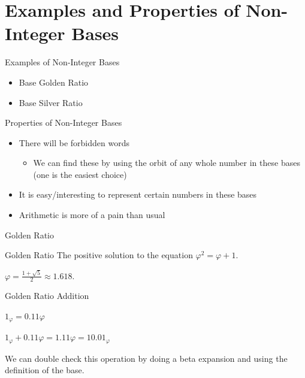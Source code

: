 \documentclass{beamer}
\begin{document}
          \section{Examples and Properties of Non-Integer Bases}
          \begin{frame}{Examples of Non-Integer Bases}
            \begin{itemize}
              \item Base Golden Ratio
              \item Base Silver Ratio
            \end{itemize}
          \end{frame}

          \begin{frame}{Properties of Non-Integer Bases}
            \begin{itemize}
              \item There will be forbidden words
              \begin{itemize}
                \item We can find these by using the orbit of any whole number in these bases (one is the easiest choice)
              \end{itemize}
              \item It is easy/interesting to represent certain numbers in these bases
              \item Arithmetic is more of a pain than usual
            \end{itemize}
          \end{frame}

          \begin{frame}{Golden Ratio}
            \begin{block}{Golden Ratio}
              The positive solution to the equation $\varphi^2 = \varphi + 1$.

              $\varphi = \frac{1+\sqrt{5}}{2} \approx 1.618$.
            \end{block}
          \end{frame}

          \begin{frame}{Golden Ratio Addition}
            \begin{example}
              $1_\varphi = 0.11\varphi$

              $1_\varphi + 0.11\varphi = 1.11\varphi = 10.01_\varphi$

              We can double check this operation by doing a beta expansion and using the definition of the base.
            \end{example}
          \end{frame}
\end{document}
